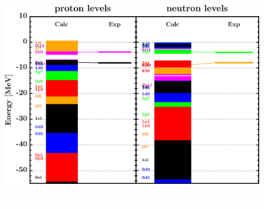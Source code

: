 \documentclass[twocolumn,secnumarabic,amssymb, nobibnotes, aps, prl,
superscriptaddress, nobalancelastpage, draft]{revtex4}
\begin{document}
\begin{figure}[!htb]
\begin{minipage}{0.4\linewidth}
        \label{DOM_pb208_chargeDensity}
    \end{minipage}
    \begin{minipage}{0.35\linewidth}
        \centering
        \includegraphics[width=\linewidth]{figures/pb208_SPLevels.png}
        \label{DOM_pb208_SPLevels}
    \end{minipage}
    \begin{minipage}{0.4\linewidth}
        \centering
        \includegraphics[width=\linewidth]{figures/pb208_RMSRadius.png}

\end{minipage}
\end{figure}
\end{document}
